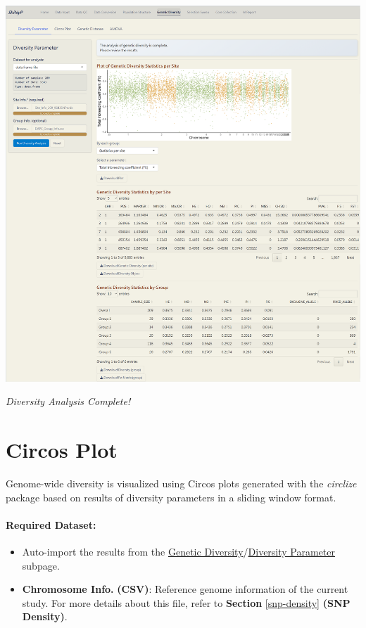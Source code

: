 \documentclass[
]{book}
\begin{document}
\includegraphics{images/clipboard-4215023438.png}

\emph{Diversity Analysis Complete!}

\section{Circos Plot}\label{circos-plot}

Genome-wide diversity is visualized using Circos plots generated with the \emph{circlize} package \citep{gu2014} based on results of diversity parameters in a sliding window format.

\paragraph*{Required Dataset:}\label{sec-required-dataset-chr}

\begin{itemize}
\item
  Auto-import the results from the \ul{Genetic Diversity}/\ul{Diversity Parameter} subpage.
\item
  \textbf{Chromosome Info.} \textbf{(CSV)}: Reference genome information of the current study. For more details about this file, refer to \textbf{Section} \ref{snp-density} \textbf{(SNP Density)}.
\end{itemize}
\end{document}
